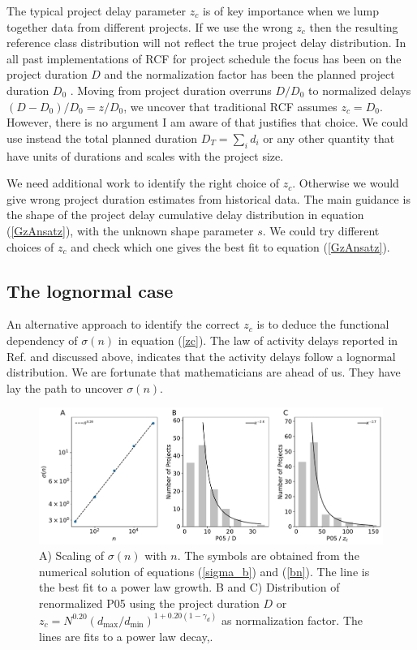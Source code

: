 \documentclass[11pt]{article}
\begin{document}
The typical project delay parameter $z_c$ is of key importance when we lump together data from different projects. If we use the wrong $z_c$ then the resulting reference class distribution will not reflect the true project delay distribution. In all past implementations of RCF for project schedule the focus has been on the project duration $D$ and the normalization factor has been the planned project duration $D_0$ \cite{flyvbjerg06, natarajan22}. Moving from project duration overruns $D/D_0$ to normalized delays $(D-D_0)/D_0 = z/D_0$, we uncover that traditional RCF assumes $z_c = D_0$. However, there is no argument I am aware of that justifies that choice. We could use instead the total planned duration $D_T = \sum_i d_i$ or any other quantity that have units of durations and scales with the project size.

We need additional work to identify the right choice of $z_c$. Otherwise we would give wrong project duration estimates from historical data. The main guidance is the shape of the project delay cumulative delay distribution in equation (\ref{GzAnsatz}), with the unknown shape parameter $s$. We could try different choices of $z_c$ and check which one gives the best fit to equation (\ref{GzAnsatz}).

\subsection{The lognormal case}

An alternative approach to identify the correct $z_c$ is to deduce the functional dependency of $\sigma(n)$ in equation (\ref{zc}). The law of activity delays reported in Ref. \cite{vazquez23law} and discussed above, indicates that the activity delays follow a lognormal distribution. We are fortunate that mathematicians are ahead of us. They have lay the path to uncover $\sigma(n)$.

\begin{figure}[t]
\includegraphics[width=6.3in]{fig_zc}
\caption{A) Scaling of $\sigma(n)$ with $n$. The symbols are obtained from the numerical solution of equations (\ref{sigma_b}) and (\ref{bn}). The line is the best fit to a power law growth. B and C) Distribution of renormalized P05 using the project duration $D$ or $z_c = N^{0.20} (d_{\max}/d_{\min})^{1+0.20(1-\gamma_d)}$ as normalization factor. The lines are fits to a power law decay,.}
\label{fig_zc}
\end{figure}
\end{document}
